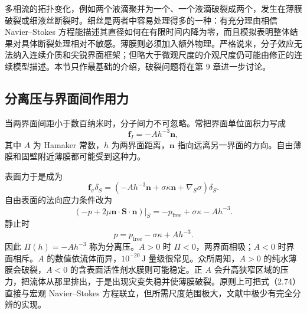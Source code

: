 \documentclass[11pt,a4paper,openany,fontset=none]{ctexbook}
\newenvironment{sourceblock}
  {\par\addvspace{0.65\baselineskip}\noindent\begin{minipage}{\linewidth}\centering}
  {\end{minipage}\par\addvspace{0.48\baselineskip}}
\begin{document}
多相流的拓扑变化，例如两个液滴聚并为一个、一个液滴破裂成两个，发生在薄膜破裂或细液丝断裂时。细丝是两者中容易处理得多的一种：有充分理由相信 Navier--Stokes 方程能描述其直径如何在有限时间内降为零，而且模拟表明整体结果对具体断裂处理相对不敏感。薄膜则必须加入额外物理。严格说来，分子效应无法纳入连续介质和尖锐界面框架；但略大于微观尺度的介观尺度仍可能由修正的连续模型描述。本节只作最基础的介绍，破裂问题将在第 9 章进一步讨论。

\subsection{分离压与界面间作用力}


当两界面间距小于数百纳米时，分子间力不可忽略。常把界面单位面积力写成
\begin{equation}
 \bm f_I=-Ah^{-3}\bm n, \tag{2.72}
\end{equation}
其中 $A$ 为 Hamaker 常数，$h$ 为两界面距离，$\bm n$ 指向远离另一界面的方向。自由薄膜和固壁附近薄膜都可能受到这种力。

\begin{sourceblock}
\end{sourceblock}

\begin{sourceblock}
\end{sourceblock}

表面力于是成为
\begin{equation}
 \bm f_\sigma\delta_S=\left(-Ah^{-3}\bm n+\sigma\kappa\bm n+\nabla_S\sigma\right)\delta_S. \tag{2.73}
\end{equation}
自由表面的法向应力条件改为
\begin{equation}
 (-p+2\mu\bm n\cdot\bm S\cdot\bm n)|_S=-p_{\mathrm{free}}+\sigma\kappa-Ah^{-3}. \tag{2.74}
\end{equation}
静止时
\begin{equation}
 p=p_{\mathrm{free}}-\sigma\kappa+Ah^{-3}. \tag{2.75}
\end{equation}
因此 $\Pi(h)=-Ah^{-3}$ 称为分离压。$A>0$ 时 $\Pi<0$，两界面相吸；$A<0$ 时界面相斥。$A$ 的数值依流体而异，$10^{-20}\,\mathrm J$ 量级很常见。众所周知，$A>0$ 的纯水薄膜会破裂，$A<0$ 的含表面活性剂水膜则可能稳定。正 $A$ 会升高狭窄区域的压力，把流体从那里排出，于是出现灾变失稳并使薄膜破裂。原则上可把式（2.74）直接与宏观 Navier--Stokes 方程联立，但所需尺度范围极大，文献中极少有完全分辨的实现。
\end{document}
